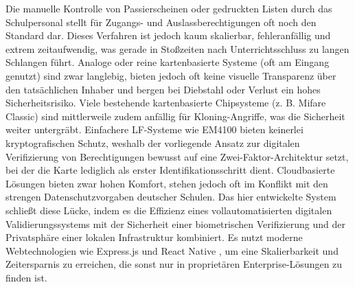 Die manuelle Kontrolle von Passierscheinen oder gedruckten Listen durch das Schulpersonal stellt für Zugangs- und Auslassberechtigungen oft noch den Standard dar. Dieses Verfahren ist jedoch kaum skalierbar, fehleranfällig und extrem zeitaufwendig, was gerade in Stoßzeiten nach Unterrichtsschluss zu langen Schlangen führt. Analoge oder reine kartenbasierte Systeme (oft am Eingang genutzt) sind zwar langlebig, bieten jedoch oft keine visuelle Transparenz über den tatsächlichen Inhaber und bergen bei Diebstahl oder Verlust ein hohes Sicherheitsrisiko. Viele bestehende kartenbasierte Chipsysteme (z. B. Mifare Classic) sind mittlerweile zudem anfällig für Kloning-Angriffe, was die Sicherheit weiter untergräbt. Einfachere LF-Systeme wie EM4100 bieten keinerlei kryptografischen Schutz, weshalb der vorliegende Ansatz zur digitalen Verifizierung von Berechtigungen bewusst auf eine Zwei-Faktor-Architektur setzt, bei der die Karte lediglich als erster Identifikationsschritt dient. Cloudbasierte Lösungen bieten zwar hohen Komfort, stehen jedoch oft im Konflikt mit den strengen Datenschutzvorgaben deutscher Schulen. Das hier entwickelte System schließt diese Lücke, indem es die Effizienz eines vollautomatisierten digitalen Validierungssystems mit der Sicherheit einer biometrischen Verifizierung und der Privatsphäre einer lokalen Infrastruktur kombiniert. Es nutzt moderne Webtechnologien wie Express.js \autocite{expressjs2023} und React Native \autocite{reactnative2023}, um eine Skalierbarkeit und Zeitersparnis zu erreichen, die sonst nur in proprietären Enterprise-Lösungen zu finden ist.
